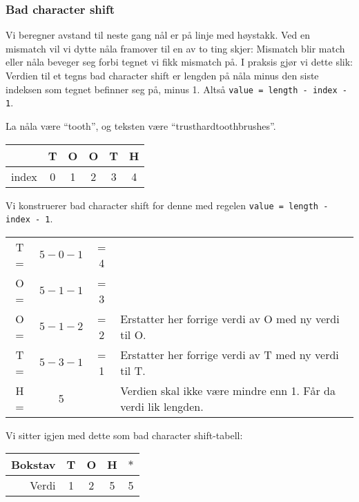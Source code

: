 	\subsubsection{Bad character shift}
		Vi beregner avstand til neste gang nål er på linje med høystakk.
		Ved en mismatch vil vi dytte nåla framover til en av to ting skjer: Mismatch blir match eller nåla beveger seg forbi tegnet vi fikk mismatch på.
		I praksis gjør vi dette slik: Verdien til et tegns bad character shift er lengden på nåla minus den siste indeksen som tegnet befinner seg på, minus 1. Altså \verb|value = length - index - 1|.
		
		\begin{example}
		La nåla være ``tooth'', og teksten være ``trusthardtoothbrushes''.
		
		\begin{center}
			\begin{tabular}{r | c c c c c}
				& T & O & O & T & H \\ \hline
				index & 0 & 1 & 2 & 3 & 4
			\end{tabular}
		\end{center}

		\noindent Vi konstruerer bad character shift for denne med regelen \verb|value = length - index - 1|.

\begin{center}
\begin{tabular}{cccl}
T = & $5-0-1$&= 4\\
O = & $5-1-1$&= 3\\
O = & $5-1-2$&= 2&Erstatter her forrige verdi av O med ny verdi til O.\\
T = &$5-3-1$& = 1&Erstatter her forrige verdi av T med ny verdi til T.\\
H = &5 &&Verdien skal ikke være mindre enn 1. Får da verdi lik lengden.\\
\end{tabular}
\end{center}
\noindent Vi sitter igjen med dette som bad character shift-tabell:
\begin{center}
\begin{tabular}{r|cccc}
Bokstav&T&O&H&$*$\\
\hline
Verdi&1&2&5&5\\
\end{tabular}
\end{center}


\end{example}
